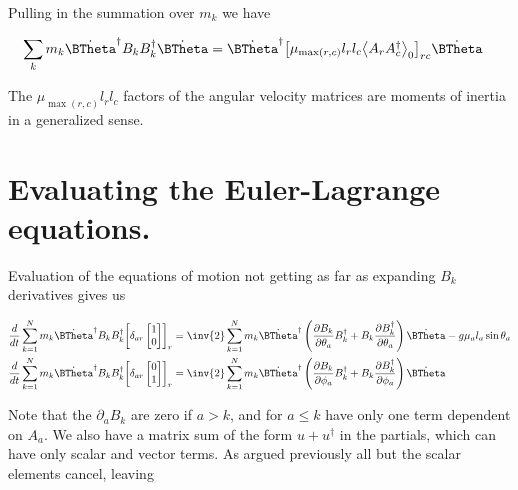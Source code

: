 Pulling in the summation over $m_k$ we have

\begin{align}\label{eqn:multiPendulumSpherical2:boo14}
\sum_k m_k
\dot{\BTheta}^\dagger
B_k B_k^\dagger
\dot{\BTheta}
&=
\dot{\BTheta}^\dagger
{\begin{bmatrix}
\mu_{\max(r,c)} l_r l_c \gpgradezero{A_r A_c^\dagger}
\end{bmatrix}}_{rc}
\dot{\BTheta}
\end{align}

The $\mu_{\max(r,c)} l_r l_c$ factors of the angular velocity matrices are moments of inertia in a generalized sense.

\section{Evaluating the Euler-Lagrange equations.}

Evaluation of the equations of motion not getting as far as expanding $B_k$ derivatives gives us

\begin{align}\label{eqn:multiPendulumSpherical2:boo6}
\frac{d}{dt}
\sum_{k=1}^N m_k
\dot{\BTheta}^\dagger
B_k B_k^\dagger
{\begin{bmatrix}
\delta_{ar}
\begin{bmatrix}
1 \\
0
\end{bmatrix}
\end{bmatrix}}_r
&=
\inv{2} \sum_{k=1}^N m_k
\dot{\BTheta}^\dagger
\left(
\PD{\theta_a}{B_k} B_k^\dagger + B_k \PD{\theta_a}{B_k^\dagger } \right)
\dot{\BTheta}
-g \mu_a l_a \sin\theta_a \\
\frac{d}{dt}
\sum_{k=1}^N m_k
\dot{\BTheta}^\dagger
B_k B_k^\dagger
{\begin{bmatrix}
\delta_{ar}
\begin{bmatrix}
0 \\
1
\end{bmatrix}
\end{bmatrix}}_r
&=
\inv{2} \sum_{k=1}^N m_k
\dot{\BTheta}^\dagger
\left(
\PD{\phi_a}{B_k} B_k^\dagger + B_k \PD{\phi_a}{B_k^\dagger } \right)
\dot{\BTheta}
\end{align}

Note that the $\partial_a B_k$ are zero if $a > k$, and for $a \le k$ have only one term dependent on $A_a$.  We also have a matrix sum of the form $u + u^\dagger$ in the partials, which can have only scalar and vector terms.  As argued previously all but the scalar elements cancel, leaving

